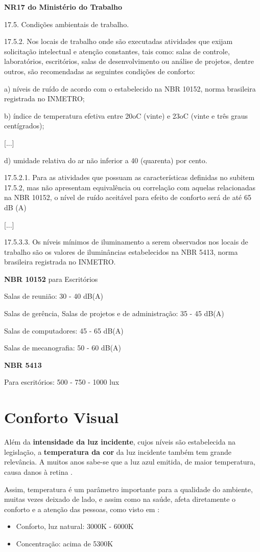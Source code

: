 \documentclass[]{politex}
\begin{document}
\begin{citacaoLonga} %
\textbf{NR17 do Ministério do Trabalho} \cite{NR17}

17.5. Condições ambientais de trabalho.

17.5.2. Nos locais de trabalho onde são executadas atividades que exijam solicitação intelectual e atenção constantes, tais como: salas de controle, laboratórios, escritórios, salas de desenvolvimento ou análise de projetos, dentre outros, são recomendadas as seguintes condições de conforto:

a) níveis de ruído de acordo com o estabelecido na NBR 10152, norma brasileira registrada no INMETRO;

b) índice de temperatura efetiva entre 20oC (vinte) e 23oC (vinte e três graus centígrados);

[...]

d) umidade relativa do ar não inferior a 40 (quarenta) por cento.

17.5.2.1. Para as atividades que possuam as características definidas no subitem 17.5.2, mas não apresentam equivalência ou correlação com aquelas relacionadas na NBR 10152, o nível de ruído aceitável para efeito de conforto será de até 65 dB (A)

[...]

17.5.3.3. Os níveis mínimos de iluminamento a serem observados nos locais de trabalho são os valores de iluminâncias estabelecidos na NBR 5413, norma brasileira registrada no INMETRO.
\end{citacaoLonga}

\begin{citacaoLonga} %
\textbf{NBR 10152} \cite{NBR10152} para Escritórios

Salas de reunião: 30 - 40 dB(A)

Salas de gerência, Salas de projetos e de administração: 35 - 45 dB(A)

Salas de computadores: 45 - 65 dB(A)

Salas de mecanografia: 50 - 60 dB(A)

\textbf{NBR 5413} \cite{NBR5413}

Para escritórios: 500 - 750 - 1000 lux
\end{citacaoLonga}

\section{Conforto Visual}
Além da \textbf{intensidade da luz incidente}, cujos níveis são estabelecida na legislação, a \textbf{temperatura da cor} da luz incidente também tem grande relevância. A muitos anos sabe-se que a luz azul emitida, de maior temperatura, causa danos à retina \cite{BlueLight}. \par
Assim, temperatura é um parâmetro importante para a qualidade do ambiente, muitas vezes deixado de lado, e assim como na saúde, afeta diretamente o conforto e a atenção das pessoas, como visto em \cite{VisualComfort}: 
\begin{itemize}
\item Conforto, luz natural: 3000K - 6000K
\item Concentração: acima de 5300K 
\end{itemize}
\end{document}
